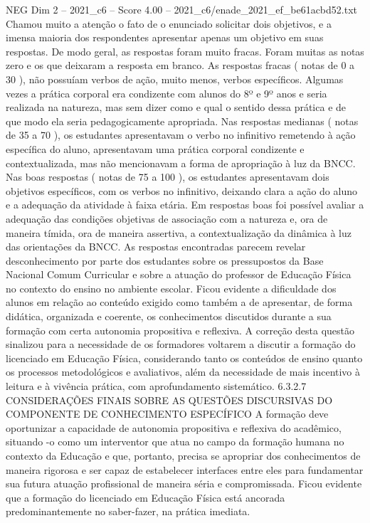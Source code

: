 \begin{textsample}{NEG Dim 2 – 2021\_c6 – Score 4.00 – 2021\_c6/enade\_2021\_ef\_be61acbd52.txt}
Chamou muito a atenção o fato de o enunciado solicitar dois objetivos, e a imensa maioria dos respondentes apresentar apenas um objetivo em suas respostas.
De modo geral, as respostas foram muito fracas.
Foram muitas as notas zero e os que deixaram a resposta em branco.
As respostas fracas ( notas de 0 a 30 ), não possuíam verbos de ação, muito menos, verbos específicos.
Algumas vezes a prática corporal era condizente com alunos do 8º e 9º anos e seria realizada na natureza, mas sem dizer como e qual o sentido dessa prática e de que modo ela seria pedagogicamente apropriada.
Nas respostas medianas ( notas de 35 a 70 ), os estudantes apresentavam o verbo no infinitivo remetendo à ação específica do aluno, apresentavam uma prática corporal condizente e contextualizada, mas não mencionavam a forma de apropriação à luz da BNCC.
Nas boas respostas ( notas de 75 a 100 ), os estudantes apresentavam dois objetivos específicos, com os verbos no infinitivo, deixando clara a ação do aluno e a adequação da atividade à faixa etária.
Em respostas boas foi possível avaliar a adequação das condições objetivas de associação com a natureza e, ora de maneira tímida, ora de maneira assertiva, a contextualização da dinâmica à luz das orientações da BNCC.
As respostas encontradas parecem revelar desconhecimento por parte dos estudantes sobre os pressupostos da Base Nacional Comum Curricular e sobre a atuação do professor de Educação Física no contexto do ensino no ambiente escolar.
Ficou evidente a dificuldade dos alunos em relação ao conteúdo exigido como também a de apresentar, de forma didática, organizada e coerente, os conhecimentos discutidos durante a sua formação com certa autonomia propositiva e reflexiva.
A correção desta questão sinalizou para a necessidade de os formadores voltarem a discutir a formação do licenciado em Educação Física, considerando tanto os conteúdos de ensino quanto os processos metodológicos e avaliativos, além da necessidade de mais incentivo à leitura e à vivência prática, com aprofundamento sistemático. 6.3.2.7 CONSIDERAÇÕES FINAIS SOBRE AS QUESTÕES DISCURSIVAS DO COMPONENTE DE CONHECIMENTO ESPECÍFICO A formação deve oportunizar a capacidade de autonomia propositiva e reflexiva do acadêmico, situando -o como um interventor que atua no campo da formação humana no contexto da Educação e que, portanto, precisa se apropriar dos conhecimentos de maneira rigorosa e ser capaz de estabelecer interfaces entre eles para fundamentar sua futura atuação profissional de maneira séria e compromissada.
Ficou evidente que a formação do licenciado em Educação Física está ancorada predominantemente no saber-fazer, na prática imediata.

\end{textsample}
